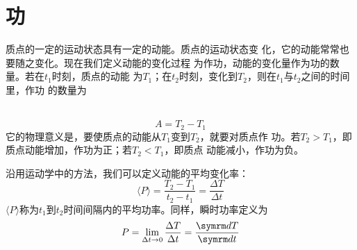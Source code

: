 \section{功}\label{sec:06.02}

质点的一定的运动状态具有一定的动能。质点的运动状态变
化，它的动能常常也要随之变化。现在我们定义动能的变化过程
为作功，动能的变化量作为功的数量。若在$ t_1 $时刻，质点的动能
为$ T _ { 1 } $；在$ t_2 $时刻，变化到$ T_2 $，则在$ t _ { 1 } $与$ t _ { 2 } $之间的时间里，作功
的数量为

~\vspace{-2em}
\begin{equation}\label{eqn:06.02.01}
  A = T _ { 2 } - T _ { 1 }
\end{equation}
它的物理意义是，要使质点的动能从$ T_1 $变到$ T_2 $，就要对质点作
功。若$ T _ { 2 } > T _ { 1 } $，即质点动能增加，作功为正；若$ T _ { 2 } < T _ { 1 } $，即质点
动能减小，作功为负。

沿用运动学中的方法，我们可以定义动能的平均变化率：
\begin{equation}\label{eqn:06.02.02}
  \langle P \rangle = \frac { T _ { 2 } - T _ { 1 } } { t _ { 2 } - t _ { 1 } } = \frac { \Delta T } { \Delta t }
\end{equation}
$ \langle P \rangle $称为$ t _ { 1 } $到$ t _ { 2 } $时间间隔内的平均功率。同样，瞬时功率定义为
\begin{equation}\label{eqn:06.02.03}
  P = \lim _ { \Delta t \to 0 } \frac { \Delta T } { \Delta t } = \frac { \dif T } { \dif t }
\end{equation}

